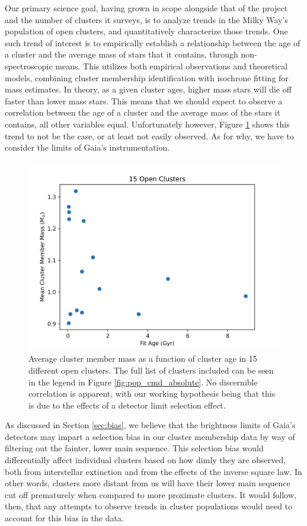 \documentclass[onecolumn,table,xcdraw,super]{aastex631}
\begin{document}
Our primary science goal, having grown in scope alongside that of the project and the number of clusters it surveys, is to analyze trends in the Milky Way's population of open clusters, and quantitatively characterize those trends. One such trend of interest is to empirically establish a relationship between the age of a cluster and the average mass of stars that it contains, through non-spectroscopic means. This utilizes both empirical observations and theoretical models, combining cluster membership identification with isochrone fitting for mass estimates. In theory, as a given cluster ages, higher mass stars will die off faster than lower mass stars. This means that we should expect to observe a correlation between the age of a cluster and the average mass of the stars it contains, all other variables equal. Unfortunately however, Figure \ref{fig:mass_vs_age_filtered} shows this trend to not be the case, or at least not easily observed. As for why, we have to consider the limits of Gaia's instrumentation.

\begin{figure}[]
    \centering
      \includegraphics[width=4.75in]{figures/mass_vs_age_filtered.png}
    \caption{Average cluster member mass as a function of cluster age in 15 different open clusters. The full list of clusters included can be seen in the legend in Figure \ref{fig:pop_cmd_absolute}. No discernible correlation is apparent, with our working hypothesis being that this is due to the effects of a detector limit selection effect.}
    \label{fig:mass_vs_age_filtered}
\end{figure}

As discussed in Section \ref{sec:bias}, we believe that the brightness limits of Gaia's detectors may impart a selection bias in our cluster membership data by way of filtering out the fainter, lower main sequence. This selection bias would differentially affect individual clusters based on how dimly they are observed, both from interstellar extinction and from the effects of the inverse square law. In other words, clusters more distant from us will have their lower main sequence cut off prematurely when compared to more proximate clusters. It would follow, then, that any attempts to observe trends in cluster populations would need to account for this bias in the data.
\end{document}
